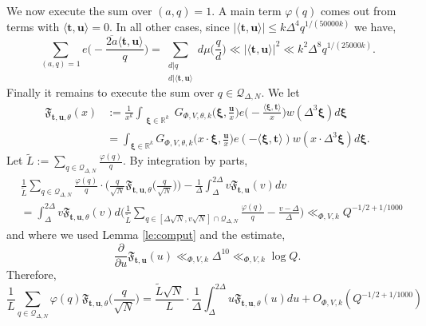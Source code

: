 \documentclass[12pt,reqno]{amsart}
\theoremstyle{plain}
\numberwithin{equation}{section}
\numberwithin{figure}{section}
\theoremstyle{plain}
\theoremstyle{definition}
\theoremstyle{remark}
\begin{document}
We now execute the sum over $(a,q)  = 1$. A main term $\varphi(q)$ comes out from terms with $\langle \boldsymbol{t}, \boldsymbol{u} \rangle = 0$. 
In all other cases, since $|\langle \boldsymbol{t}, \boldsymbol{u} \rangle | \leq k \Delta^4 q^{1/(50000k)}$ we have, 
$$
\sum_{(a,q) = 1} e \Big ( - \frac{\overline{2 a} \langle \boldsymbol{t}, \boldsymbol{u} \rangle}{q}  \Big ) = \sum_{\substack{d | q \\ d | \langle \boldsymbol{t}, \boldsymbol{u} \rangle}} d \mu \Big ( \frac{q}{d} \Big ) \ll |\langle \boldsymbol{t}, \boldsymbol{u} \rangle|^2 \ll k^2 \Delta^8 q^{1/(25000k)}.
$$
Finally it remains to execute the sum over $q \in \mathcal{Q}_{\Delta, N}$. 
We let
\begin{align*}
\mathfrak{F}_{\boldsymbol{t}, \boldsymbol{u}, \theta}(x) & := \frac{1}{x^{k}}  \int_{\substack{\boldsymbol{\xi} \in \mathbb{R}^{k}}} G_{\Phi, V, \theta, k} \Big ( \boldsymbol{\xi}, \frac{\boldsymbol{u}}{x} \Big ) e \Big ( - \frac{\langle \boldsymbol{\xi}, \boldsymbol{t} \rangle}{x} \Big ) w(\Delta^3 \boldsymbol{\xi}) d \boldsymbol{\xi} \\ & = \int_{\boldsymbol{\xi} \in \mathbb{R}^k} G_{\Phi, V, \theta, k} \Big ( x \cdot \boldsymbol{\xi}, \frac{\boldsymbol{u}}{x} \Big ) e (- \langle \boldsymbol{\xi}, \boldsymbol{t} \rangle) w (x \cdot \Delta^3 \boldsymbol{\xi}) d \boldsymbol{\xi}.
\end{align*}
Let $\widetilde{L} := \sum_{q \in \mathcal{Q}_{\Delta, N}} \frac{\varphi(q)}{q}$.
By integration by parts, 
\begin{align} \nonumber
& \frac{1}{\widetilde{L}}  \sum_{q \in \mathcal{Q}_{\Delta, N}} \frac{\varphi(q)}{q} \cdot \Big ( \frac{q}{\sqrt{N}} \mathfrak{F}_{\boldsymbol{t}, \boldsymbol{u}, \theta} \Big ( \frac{q}{\sqrt{N}} \Big ) \Big ) - \frac{1}{\Delta} \int_{\Delta}^{2 \Delta} v \mathfrak{F}_{\boldsymbol{t}, \boldsymbol{u}}(v) dv  \\ \nonumber & = \int_{\Delta}^{2 \Delta} v \mathfrak{F}_{\boldsymbol{t}, \boldsymbol{u}, \theta}(v) d \Big ( \frac{1}{\widetilde{L}} \sum_{q \in [\Delta \sqrt{N},v \sqrt{N}] \cap \mathcal{Q}_{\Delta, N}} \frac{\varphi(q)}{q} - \frac{v - \Delta}{\Delta} \Big ) \ll_{\Phi, V, k} Q^{-1/2 + 1/1000}
\end{align}
and where we used Lemma \ref{le:comput} and the estimate, 
$$
\frac{\partial}{\partial u} \mathfrak{F}_{\boldsymbol{t}, \boldsymbol{u}}(u) \ll_{\Phi, V, k} \Delta^{10} \ll_{\Phi,V, k} \log Q.
$$
Therefore, 
$$
\frac{1}{L} \sum_{q \in \mathcal{Q}_{\Delta, N}} \varphi(q) \mathfrak{F}_{\boldsymbol{t}, \boldsymbol{u}, \theta} \Big ( \frac{q}{\sqrt{N}} \Big ) = \frac{\widetilde{L} \sqrt{N}}{L} \cdot \frac{1}{\Delta} \int_{\Delta}^{2 \Delta} u \mathfrak{F}_{\boldsymbol{t}, \boldsymbol{u}, \theta} (u) du + O_{\Phi, V, k}(Q^{-1/2 + 1/1000})
$$
\end{document}
